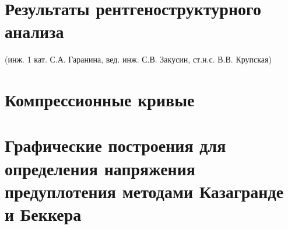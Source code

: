 \newpage
\newpage


\chapter{Результаты рентгеноструктурного анализа}\label{app:difr}
(инж. 1 кат. С.А. Гаранина, вед. инж. С.В. Закусин, ст.н.с. В.В. Крупская)



\chapter{Компрессионные кривые}\label{app:ct}


\chapter{Графические построения для определения напряжения предуплотения методами Казагранде и Беккера}\label{app:methods}
